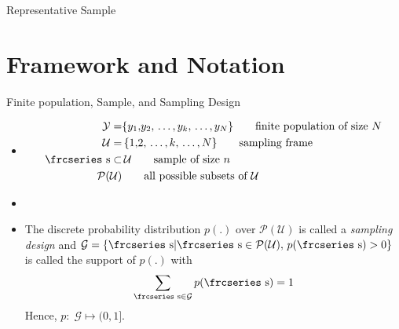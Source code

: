 \documentclass[10pt]{beamer}\usepackage[]{graphicx}\usepackage[]{color}
\newcommand{\eqname}[1]{\tag*{#1}} %
\newcommand{\textfrc}[1]{{\frcseries#1}}
\newcommand{\mathfrc}[1]{\text{\textfrc{#1}}}
\begin{document}
\begin{frame}{Representative Sample}


\end{frame}

\section{Framework and Notation}

\begin{frame}{Finite population, Sample, and Sampling Design}

 \begin{itemize}
 \item[] 
 \begin{align}
 \mathcal{Y} = & \{ y_1{,}y_2{,}\,\ldots{,}\,y_k{,}\,\ldots{,}\,y_N \} \eqname{finite population of size $N$} \\
 \mathcal{U} = &\, \{ 1{,}2{,}\,\ldots{,}\,k{,}\,\ldots{,}\,N \} \eqname{sampling frame} \\
 \mathfrc{s} \subset &\, \mathcal{U} \eqname{sample of size $n$} \\
 \mathcal{P}(\mathcal{U}) & \eqname{all possible subsets of $\mathcal{U}$}
 \end{align}
 \item[]
\item[]
The discrete probability distribution $p(.)$ over $\mathcal{P}(\mathcal{U})$ is called
a \emph{sampling design} and  $\mathcal{G}=\{ \mathfrc{s} | \mathfrc{s} \in
\mathcal{P}(\mathcal{U}),\, p(\mathfrc{s}) > 0 \}$ is called the support of $p(.)$ with
$$
\sum_{\mathfrc{s} \in \mathcal{G}} p(\mathfrc{s}) = 1
$$
Hence, $p: \; \mathcal{G} \mapsto (0, 1]$.
 \end{itemize}
\end{frame}
\end{document}
